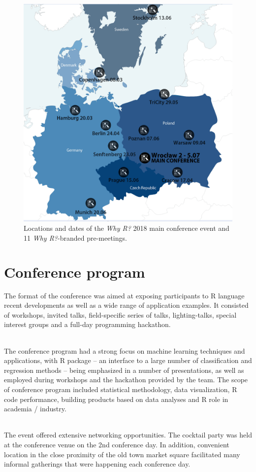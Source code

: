 \begin{figure}%
  \centering
  \includegraphics[width=0.65\columnwidth]{premeetings}
  \caption{Locations and dates of the \emph{Why R?} 2018 main conference event and 11 \emph{Why R?}-branded pre-meetings.}
  \label{figure:premeetings}
\end{figure}

\section{Conference program}

The format of the conference was aimed at exposing participants to R language recent developments as well as a wide range of application examples. It consisted of workshops, invited talks, field-specific series of talks, lighting-talks, special interest groups and a full-day programming hackathon. 

~\\ The conference program had a strong focus on machine learning techniques and applications, with  \citep{mlr} R package -- an interface to a large number of classification and regression methods -- being emphasized in a  number of presentations, as well as employed during workshops and the hackathon provided by the  team. The scope of conference program included statistical methodology, data visualization, R code performance,  building products based on data analyses and R role in academia / industry. 

~\\ The event offered extensive networking opportunities. The cocktail party was held at the conference venue on the 2nd conference day. In addition, convenient location in the close proximity of the old town market square facilitated many informal gatherings that were happening each conference day.

